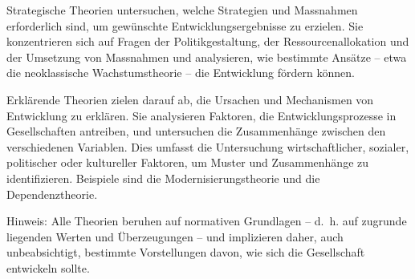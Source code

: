 \documentclass[
  nswissgerman,
  a4paper,
  DIV=11,
  numbers=noendperiod,
  oneside,
  openany]{scrreprt}
\begin{document}
Strategische Theorien untersuchen, welche Strategien und Massnahmen
erforderlich sind, um gewünschte Entwicklungsergebnisse zu erzielen. Sie
konzentrieren sich auf Fragen der Politikgestaltung, der
Ressourcenallokation und der Umsetzung von Massnahmen und analysieren,
wie bestimmte Ansätze -- etwa die neoklassische Wachstumstheorie -- die
Entwicklung fördern können.

Erklärende Theorien zielen darauf ab, die Ursachen und Mechanismen von
Entwicklung zu erklären. Sie analysieren Faktoren, die
Entwicklungsprozesse in Gesellschaften antreiben, und untersuchen die
Zusammenhänge zwischen den verschiedenen Variablen. Dies umfasst die
Untersuchung wirtschaftlicher, sozialer, politischer oder kultureller
Faktoren, um Muster und Zusammenhänge zu identifizieren. Beispiele sind
die Modernisierungstheorie und die Dependenztheorie.

Hinweis: Alle Theorien beruhen auf normativen Grundlagen -- d.~h. auf
zugrunde liegenden Werten und Überzeugungen -- und implizieren daher,
auch unbeabsichtigt, bestimmte Vorstellungen davon, wie sich die
Gesellschaft entwickeln sollte.

\begingroup\fontsize{8}{10}\selectfont
\end{document}

